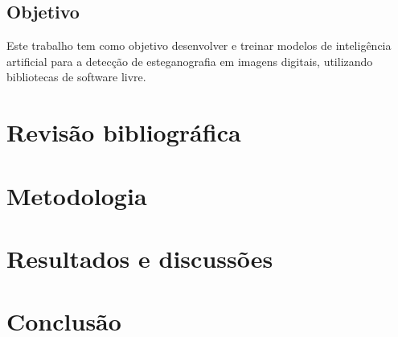 \documentclass[12pt]{article}
\begin{document}
\subsection{Objetivo}

Este trabalho tem como objetivo desenvolver e treinar modelos de inteligência
artificial para a detecção de esteganografia em imagens digitais, utilizando
bibliotecas de software livre.

\section{Revisão bibliográfica} \label{sec:firstpage}

\section{Metodologia}

\section{Resultados e discussões}

\section{Conclusão}\label{sec:figs}






\end{document}
